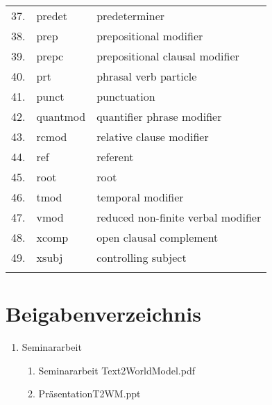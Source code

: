 \begin{longtable}{|l|l|l|}
37. & predet & predeterminer\\
38. & prep & prepositional modifier\\
39. & prepc & prepositional clausal modifier\\
40. & prt & phrasal verb particle\\
41. & punct & punctuation\\
42. & quantmod & quantifier phrase modifier\\
43. & rcmod & relative clause modifier\\
44. & ref & referent\\
45. & root & root\\
46. & tmod & temporal modifier\\
47. & vmod & reduced non-finite verbal modifier\\
48. & xcomp & open clausal complement\\
49. & xsubj & controlling subject\\
\label{table:DEPTAGS}
\end{longtable}

\section{Beigabenverzeichnis}
\begin{enumerate}
	\item Seminararbeit
	\begin{enumerate}
		\item Seminararbeit Text2WorldModel.pdf
		\item PräsentationT2WM.ppt
	\end{enumerate}

\end{enumerate} 

